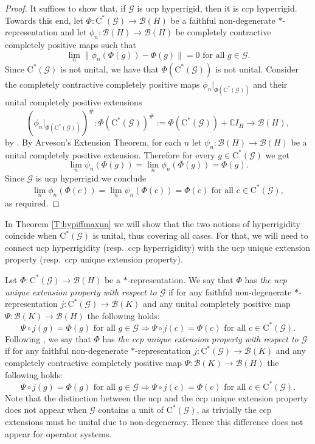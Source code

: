 \documentclass[11pt, draft]{amsart}
\numberwithin{equation}{section}
\theoremstyle{plain}
\theoremstyle{definition}
\theoremstyle{remark}
\newcommand{\B}{{\mathcal{B}}}
\newcommand{\G}{{\mathcal{G}}}
\newcommand{\bC}{\mathbb{C}}
\newcommand{\foral}{\text{ for all }}
\newcommand{\ca}{\mathrm{C}^*}
\begin{document}
\begin{proof}
It suffices to show that, if $\G$ is ucp hyperrigid, then it is ccp hyperrigid.
Towards this end, let $\Phi \colon \ca(\G) \to \B(H)$ be a faithful non-degenerate $*$-representation and let $\phi_n \colon \B(H) \to \B(H)$ be completely contractive completely positive maps such that
\[
\lim_n \|\phi_n(\Phi(g)) - \Phi(g)\| = 0 \foral g \in \G.
\]
Since $\ca(\G)$ is not unital, we have that $\Phi(\ca(\G))$ is not unital.
Consider the completely contractive completely positive maps $\phi_n|_{\Phi(\ca(\G))}$ and their unital completely positive extensions 
\[
\left(\phi_n|_{\Phi(\ca(\G))}\right)^{\#} \colon \Phi(\ca(\G))^{\#} := \Phi(\ca(\G)) + \bC I_H \to \B(H),
\]
by \cite[Proposition 2.2.1]{BO08}.
By Arveson's Extension Theorem, for each $n$ let $\psi_n \colon \B(H) \to \B(H)$ be a unital completely positive extension.
Therefore for every $g \in \ca(\G)$ we get
\[
\lim_n \psi_n(\Phi(g)) = \lim_n \phi_n(\Phi(g)) = \Phi(g).
\]
Since $\G$ is ucp hyperrigid we conclude 
\[
\lim_n \phi_n(\Phi(c)) = \lim_n \psi_n(\Phi(c)) = \Phi(c)
\foral
c \in \ca(\G),
\]
as required.
\end{proof}

In Theorem \ref{T:hypiffmaxun} we will show that the two notions of hyperrigidity coincide when $\ca(\G)$ is unital, thus covering all cases. 
For that, we will need to connect ucp hyperrigidity (resp.\ ccp hyperrigidity) with the ucp unique extension property (resp.\ ccp unique extension property).

Let $\Phi \colon \ca(\G) \to \B(H)$ be a $*$-representation. 
We say that $\Phi$ has \emph{the ucp unique extension property with respect to $\G$} if for any faithful non-degenerate $*$-representation $j\colon \ca(\G) \to \B(K)$ and any unital completely positive map $\Psi \colon \B(K) \to \B(H)$ the following holds:
\[
\Psi \circ j(g) = \Phi(g) \foral g \in \G \Rightarrow \Psi \circ j(c) = \Phi(c) \foral c \in \ca(\G).
\]
Following \cite[Definition 2.3]{Sal17}, we say that $\Phi$ has \emph{the ccp unique extension property with respect to $\G$} if for any faithful non-degenerate $*$-representation $j\colon \ca(\G) \to \B(K)$ and any completely contractive completely positive map $\Psi \colon \B(K) \to \B(H)$ the following holds:
\[
\Psi \circ j(g) = \Phi(g) \foral g \in \G \Rightarrow \Psi \circ j(c) = \Phi(c) \foral c \in \ca(\G).
\]
Note that the distinction between the ucp and the ccp unique extension property does not appear when $\G$ contains a unit of $\ca(\G)$, as trivially the ccp extensions must be unital due to non-degeneracy.
Hence this difference does not appear for operator systems.
\end{document}
